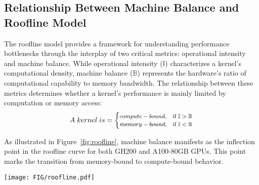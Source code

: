 \subsection{Relationship Between Machine Balance and Roofline Model}
The roofline model provides a framework for understanding performance bottlenecks through the interplay of two critical metrics: operational intensity and machine balance. While operational intensity ($\mathbb{I}$) characterizes a kernel's computational density, machine balance ($\mathbb{B}$) represents the hardware's ratio of computational capability to memory bandwidth. The relationship between these metrics determines whether a kernel's performance is mainly limited by computation or memory access:
\begin{equation}\footnotesize
A\ kernel\ is =
\begin{cases}
compute-bound, & \text{if } \mathbb{I}> \mathbb{B}\\
memory-bound,  & \text{if } \mathbb{I}< \mathbb{B}
\end{cases}
\end{equation}

As illustrated in Figure~\ref{fig:roofline}, machine balance manifests as the inflection point in the roofline curve for both GH200 and A100-80GB GPUs. This point marks the transition from memory-bound to compute-bound behavior.%

\begin{figure*}[t]
\centering
\texttt{[image: FIG/roofline.pdf]}
\vspace{-30pt}
\caption{\label{fig:roofline} An example of the roofline model for both GH200 and A100-80GB GPU.
}
\end{figure*}





